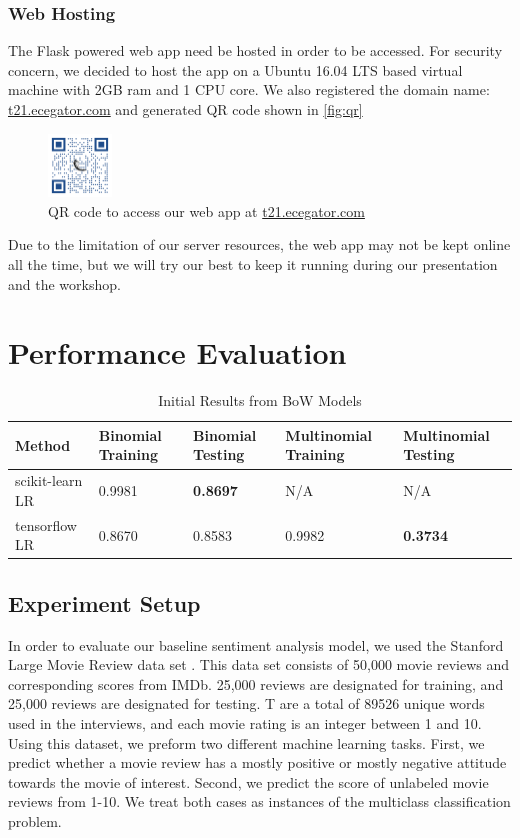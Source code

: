 \documentclass[conference]{IEEEtran}
\begin{document}
\subsubsection{Web Hosting}
\label{model:front:host}
    The Flask powered web app need be hosted in order to be accessed. For security concern,
    we decided to host the app on a Ubuntu 16.04 LTS based virtual machine with 2GB ram and
    1 CPU core. We also registered the domain name: \url{t21.ecegator.com} and generated
    QR code shown in \autoref{fig:qr}
    \begin{figure}
        \center\includegraphics[width=0.15\textwidth]{figure/qr_website}
        \caption{QR code to access our web app at \url{t21.ecegator.com}}
        \label{fig:qr}
    \end{figure}
    Due to the limitation of our server resources, the web app may not be kept online
    all the time, but we will try our best to keep it running during our presentation
    and the workshop.

\section{Performance Evaluation}
\label{performance}
    \begin{table}[]
        \centering
        \caption{Initial Results from BoW Models}
        \label{my-label}
        \begin{tabularx}{\textwidth}{ X  X  X X  X }
        \toprule
        Method & Binomial Training & Binomial Testing & Multinomial Training & Multinomial Testing \\
        \midrule
        scikit-learn LR & 0.9981 & \textbf{0.8697} & N/A & N/A \\
        tensorflow LR & 0.8670 & 0.8583 & 0.9982 & \textbf{0.3734} \\
        \bottomrule
        \end{tabularx}
    \end{table}
\subsection{Experiment Setup}
    In order to evaluate our baseline sentiment analysis model, we used the
    Stanford Large Movie Review data set \cite{maas2011learning}. This data
    set consists of 50,000 movie reviews and corresponding scores from IMDb.
    25,000 reviews are designated for training, and 25,000 reviews are designated for testing.
    T are a total of 89526 unique words used in the interviews, and each
    movie rating is an integer between 1 and 10. Using this dataset, we preform
    two different machine learning tasks. First, we predict whether a movie review
    has a mostly positive or mostly negative attitude towards the movie of interest. 
    Second, we predict the score of unlabeled movie reviews from 1-10. We treat
    both cases as instances of the multiclass classification problem.
    
\end{document}
